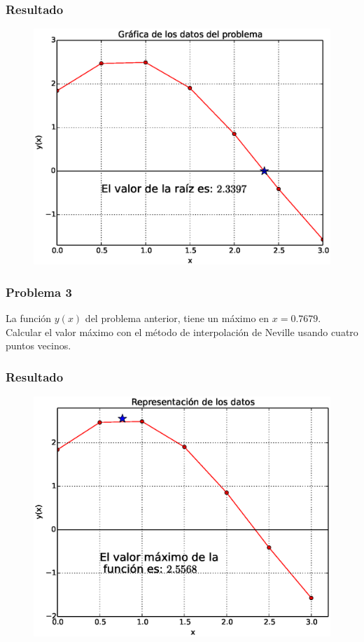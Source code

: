 \begin{frame}
\frametitle{Resultado}
\begin{figure}
	\centering
	\includegraphics[scale=0.5]{Imagenes/Problema2_01.eps} 
\end{figure}
\end{frame}
\begin{frame}
\frametitle{Problema 3}
La función $y(x)$ del problema anterior, tiene un máximo en $x=0.7679$. Calcular el valor máximo con el método de interpolación de Neville usando cuatro puntos vecinos.
\\
\bigskip
\end{frame}
\begin{frame}
\frametitle{Resultado}
\begin{figure}
	\centering
	\includegraphics[scale=0.5]{Imagenes/Problema3_01.eps} 
\end{figure}
\end{frame}
